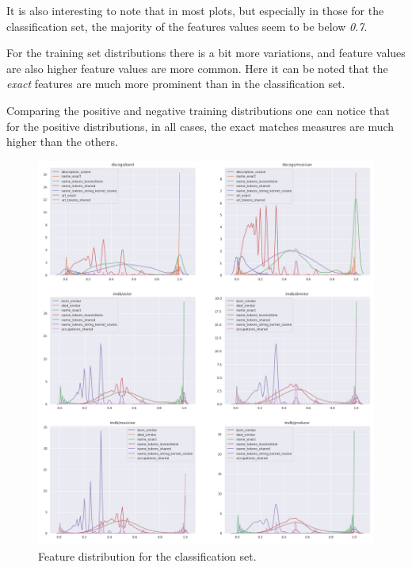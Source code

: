 \documentclass[epsfig,a4paper,11pt,titlepage,twoside,openany]{book}
\begin{document}
It is also interesting to note that in most plots, but especially in those for the classification set, the majority of the features values seem to be below \textit{0.7}.

For the training set distributions there is a bit more variations, and feature values are also higher feature values are more common. Here it can be noted that the \textit{exact} features are much more prominent than in the classification set. 

Comparing the positive and negative training distributions one can notice that for the positive distributions, in all cases, the exact matches measures are much higher than the others.


\begin{figure}[H]
  \centering \includegraphics[width=\textwidth]{classification_feature_distribution} 
  \caption{Feature distribution for the classification set.}
  \label{fig:distribution-of-classification-features-1}
\end{figure}
\end{document}
